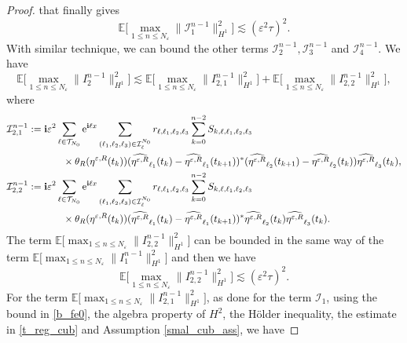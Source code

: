 \documentclass[a4paper]{amsart}
\begin{document}
\begin{proof}
   that finally gives
   $$
    \mathbb{E}\big[\max_{1\le n\le N_\varepsilon}\|\mathcal{I}_{1}^{n-1}\|_{H^1}^2\big] \lesssim (\varepsilon^2 \tau)^2.
   $$
   With similar technique, we can bound the other terms $\mathcal{I}_{2}^{n-1}, \mathcal{I}_3^{n-1}$ and $\mathcal{I}_4^{n-1}$. We have
   $$
   \mathbb{E}\big[\max_{1\le n\le N_\varepsilon}\|I_2^{n-1}\|^2_{H^1}\big]\lesssim \mathbb{E}\big[\max_{1\le n\le N_\varepsilon}\|I_{2,1}^{n-1}\|^2_{H^1}\big]+\mathbb{E}\big[\max_{1\le n\le N_\varepsilon}\|I_{2,2}^{n-1}\|^2_{H^1}\big],
   $$
   where
   \begin{align*}
      &\mathcal{I}_{2,1}^{n-1}:={\bf i}\varepsilon^2 \sum_{\ell\in\mathcal{T}_{N_0}}{\rm e}^{{\bf i}\ell x}\sum_{(\ell_1,\ell_2,\ell_3)\in\mathcal{I}_{\ell}^{N_0}}
    r_{\ell,\ell_1,\ell_2,\ell_3}\sum_{k=0}^{n-2}S_{k,\ell,\ell_1,\ell_2,\ell_3}\\
    &\hspace{2cm}\times \theta_R(\eta^{\varepsilon,R}(t_k)) (\widehat{\eta^{\varepsilon,R}}_{\ell_1}(t_k)-\widehat{\eta^{\varepsilon,R}}_{\ell_1}(t_{k+1}))^*(\widehat{\eta^{\varepsilon,R}}_{\ell_2}(t_{k+1})-\widehat{\eta^{\varepsilon,R}}_{\ell_2}(t_{k}))\widehat{\eta^{\varepsilon,R}}_{\ell_3}(t_k),\\
    &\mathcal{I}_{2,2}^{n-1}:={\bf i}\varepsilon^2 \sum_{\ell\in\mathcal{T}_{N_0}}{\rm e}^{{\bf i}\ell x}\sum_{(\ell_1,\ell_2,\ell_3)\in\mathcal{I}_{\ell}^{N_0}}
    r_{\ell,\ell_1,\ell_2,\ell_3}\sum_{k=0}^{n-2}S_{k,\ell,\ell_1,\ell_2,\ell_3}\\
    &\hspace{2cm}\times \theta_R(\eta^{\varepsilon,R}(t_k)) (\widehat{\eta^{\varepsilon,R}}_{\ell_1}(t_k)-\widehat{\eta^{\varepsilon,R}}_{\ell_1}(t_{k+1}))^*\widehat{\eta^{\varepsilon,R}}_{\ell_2}(t_k)\widehat{\eta^{\varepsilon,R}}_{\ell_3}(t_k).
   \end{align*}
   The term $\mathbb{E}\big[\displaystyle\max_{1\le n\le N_\varepsilon}\|I_{2,2}^{n-1}\|^2_{H^1}\big]$ can be bounded in the same way of the term $\mathbb{E}\big[\displaystyle\max_{1\le n\le N_\varepsilon}\|I_{1}^{n-1}\|^2_{H^1}\big]$ and then we have
   $$
   \mathbb{E}\big[\max_{1\le n\le N_\varepsilon}\|I_{2,2}^{n-1}\|^2_{H^1}\big]\lesssim (\varepsilon^2 \tau)^2.
   $$
   For the term $\mathbb{E}\big[\displaystyle\max_{1\le n\le N_\varepsilon}\|I_{2,1}^{n-1}\|^2_{H^1}\big]$, as done for the term $\mathcal{I}_1$, using the bound in \eqref{b_fe0}, the algebra property of $H^2$, the Hölder inequality, the estimate in \ref{t_reg_cub} and Assumption \ref{smal_cub_ass}, we have

\end{proof}
\end{document}
